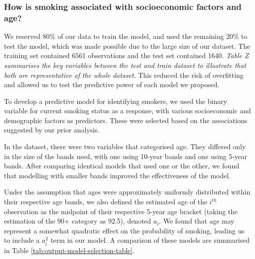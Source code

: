 \documentclass[
  11pt,
]{article}
\begin{document}
\subsubsection{How is smoking associated with socioeconomic factors and
age?}\label{how-is-smoking-associated-with-socioeconomic-factors-and-age}

We reserved 80\% of our data to train the model, and used the remaining
20\% to test the model, which was made possible due to the large size of
our dataset. The training set contained 6561 observations and the test
set contained 1640. \emph{Table Z summarises the key variables between
the test and train dataset to illustrate that both are representative of
the whole dataset.} This reduced the risk of overfitting and allowed us
to test the predictive power of each model we proposed.

To develop a predictive model for identifying smokers, we used the
binary variable for current smoking status as a response, with various
socioeconomic and demographic factors as predictors. These were selected
based on the associations suggested by our prior analysis.

In the dataset, there were two variables that categorised age. They
differed only in the size of the bands used, with one using 10-year
bands and one using 5-year bands. After comparing identical models that
used one or the other, we found that modelling with smaller bands
improved the effectiveness of the model.

Under the assumption that ages were approximately uniformly distributed
within their respective age bands, we also defined the estimated age of
the \(i^{th}\) observation as the midpoint of their respective 5-year
age bracket (taking the estimation of the 90+ category as 92.5), denoted
\(a_i\). We found that age may represent a somewhat quadratic effect on
the probability of smoking, leading us to include a \(a_i^2\) term in
our model. A comparison of these models are summarised in Table
\ref{tab:output-model-selection-table}.
\end{document}
